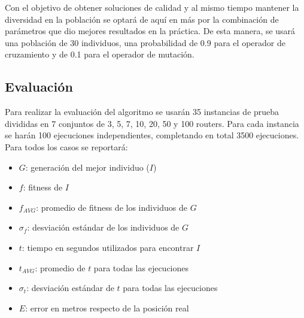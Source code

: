 \documentclass[journal]{IEEEtran}
\begin{document}
Con el objetivo de obtener soluciones de calidad y al mismo tiempo mantener la diversidad en la población se optará de aquí en más por la combinación de parámetros que dio mejores resultados en la práctica. De esta manera, se usará una población de 30 individuos, una probabilidad de 0.9 para el operador de cruzamiento y de 0.1 para el operador de mutación.\\

\subsection{Evaluación}

Para realizar la evaluación del algoritmo se usarán 35 instancias de prueba divididas en 7 conjuntos de 3, 5, 7, 10, 20, 50 y 100 routers. Para cada instancia se harán 100 ejecuciones independientes, completando en total 3500 ejecuciones.\\

Para todos los casos se reportará:\\

\begin{itemize}
\item $G$: generación del mejor individuo ($I$)
\item $f$: fitness de $I$
\item $f_{AVG}$: promedio de fitness de los individuos de $G$
\item $\sigma_f$: desviación estándar de los individuos de $G$
\item $t$: tiempo en segundos utilizados para encontrar $I$
\item $t_{AVG}$: promedio de $t$ para todas las ejecuciones
\item $\sigma_t$: desviación estándar de $t$ para todas las ejecuciones
\item $E$: error en metros respecto de la posición real
\end{itemize}
\end{document}
